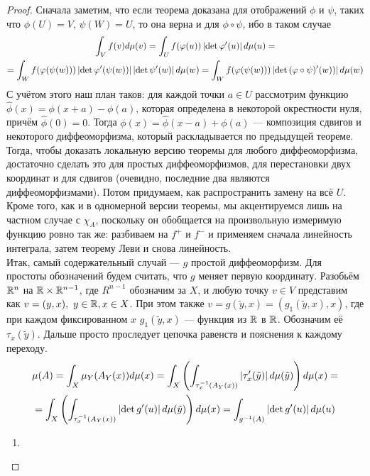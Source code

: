\begin{proof}
	Сначала заметим, что если теорема доказана для отображений $\phi$ и $\psi$, таких что $\phi(U) = V$, $\psi(W) = U$, то она верна и для $\phi \circ \psi$, ибо в таком случае
	\begin{multline*}
		\int_V f(v) d\mu(v) = \int_{U} f(\varphi(u)) \left|\det{\ensuremath{\varphi}'(u)}\right| d\mu(u) = \\
		= \int_{W} f(\varphi(\psi(w))) \left|\det{\ensuremath{\varphi}'(\psi(w))}\right| \left|\det{\psi'(w)}\right| d\mu(w) = \int_{W} f(\varphi(\psi(w))) \left|\det{(\ensuremath{\varphi}\circ \psi)'(w))}\right| d\mu(w)
	\end{multline*}
	С учётом этого наш план таков: для каждой точки $a \in U$ рассмотрим функцию $\hat\phi(x) = \phi(x + a) - \phi(a)$, которая определена в некоторой окрестности нуля, причём $\hat\phi(0) = 0$. Тогда $\phi(x) = \hat\phi(x - a) + \phi(a)$ --- композиция сдвигов и некоторого диффеоморфизма, который раскладывается по предыдущей теореме. Тогда, чтобы доказать локальную версию теоремы для любого диффеоморфизма, достаточно сделать это для простых диффеоморфизмов, для перестановки двух координат и для сдвигов (очевидно, последние два являются диффеоморфизмами). Потом придумаем, как распространить замену на всё $U$. Кроме того, как и в одномерной версии теоремы, мы акцентируемся лишь на частном случае с $\chi_A$, поскольку он обобщается на произвольную измеримую функцию ровно так же: разбиваем на $f^+$ и $f^-$ и применяем сначала линейность интеграла, затем теорему Леви и снова линейность. \\
	Итак, самый содержательный случай --- $g$ простой диффеоморфизм. Для простоты обозначений будем считать, что $g$ меняет первую координату. Разобьём $\mathbb{R}^n$ на $\mathbb{R} \times \mathbb{R}^{n-1}$, где $R^{n-1}$ обозначим за $X$, и любую точку $v \in V$ представим как $v = (y, x), \ y \in \mathbb{R}, x \in X$. При этом также $v = g(\tilde y, x) = (g_1(\tilde y, x), x)$, где при каждом фиксированном $x$ $g_1(\tilde y, x)$ --- функция из $\mathbb{R}$ в $\mathbb{R}$. Обозначим её $\tau_x(\tilde y)$. Дальше просто проследует цепочка равенств и пояснения к каждому переходу.
	\begin{multline*}
		\mu(A) = \int_X \mu_Y(A_Y(x)) d\mu(x) = \int_X \left( \int_{\tau_x^{-1}(A_Y(x))} \left|\tau_x'(\tilde y)\right| d\mu(\tilde y)\right) d\mu(x) = \\
		= \int_X \left( \int_{\tau_x^{-1}(A_Y(x))} \left|\det{g'(u)}\right| d\mu(\tilde y)\right) d\mu(x) = \int_{g^{-1}(A)} \left|\det{g'(u)}\right| d\mu(u)
	\end{multline*}
	\begin{enumerate}
		\item

\end{enumerate}
\end{proof}
